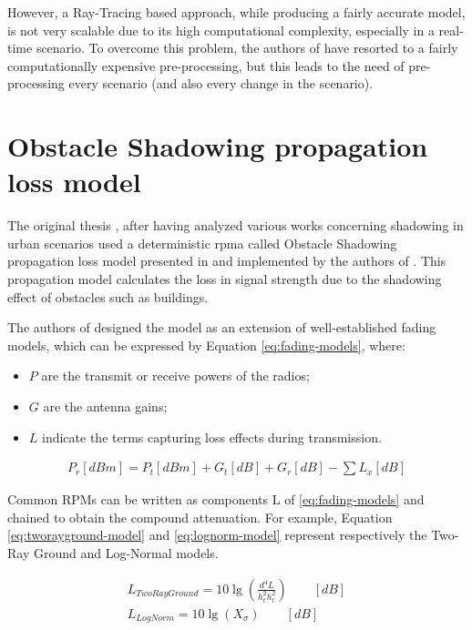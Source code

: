 		
		However, a Ray-Tracing based approach, while producing a fairly accurate model, is not very scalable due to its high computational complexity, especially in a real-time scenario. To overcome this problem, the authors of \cite{STEPANOV200861} have resorted to a fairly computationally expensive pre-processing, but this leads to the need of pre-processing every scenario (and also every change in the scenario).
		
		
	
	\section{Obstacle Shadowing propagation loss model}
		The original thesis \cite{ROM2017}, after having analyzed various works concerning shadowing in urban scenarios \cite{Giordano:2010:CST:1860058.1860065} \cite{4020783} used a deterministic \gls{rpma} called Obstacle Shadowing propagation loss model presented in \cite{5720204} and implemented by the authors of \cite{Carpenter:2015:OMI:2756509.2756512}.  This propagation model calculates the loss in signal strength due to the shadowing effect of obstacles such as buildings. 
		
		
		The authors of \cite{5720204} designed the model as an extension of well-established fading models, which can be expressed by Equation \ref{eq:fading-models}, where:
		\begin{itemize}
			\item $P$ are the transmit or receive powers of the radios;
			\item $G$ are the antenna gains;
			\item $L$ indicate the terms capturing loss effects during transmission.
		\end{itemize}
		
		\begin{gather}
			P_r[dBm] = P_t[dBm] + G_t[dB] + G_r[dB] - \sum L_x[dB] 														\label{eq:fading-models}
		\end{gather}
	
		Common RPMs can be written as components L of \ref{eq:fading-models} and chained to obtain the compound attenuation. For example, Equation \ref{eq:tworayground-model} and \ref{eq:lognorm-model} represent respectively the Two-Ray Ground and Log-Normal models.

		\begin{gather}
			L_{TwoRayGround} = 10 \lg \left( \frac{d^4 L}{h^2_t h^2_t} \right)	\qquad [dB]		\label{eq:tworayground-model} \\
			L_{LogNorm} = 10 \lg \left( X_\sigma \right)	\qquad [dB]													\label{eq:lognorm-model}
		\end{gather}
		
